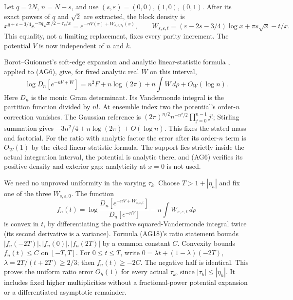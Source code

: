 \documentclass[11pt]{article}
\newcommand{\dd}{\,d}\newcommand{\Gram}{\operatorname{Gram}}
\begin{document}
Let $q=2N$, $n=N+s$, and use $(s,\varepsilon)=(0,0),(1,0),(0,1)$.
After its exact powers of $q$ and $\sqrt2$ are extracted, the block density is
\begin{equation}\tag{AG17}
 x^{q+\varepsilon-3/4}e^{-\pi q\sqrt x/2-\tau_k/x}
 =e^{-nV(x)+W_{s,\varepsilon,\tau_k}(x)},\qquad
 W_{s,\varepsilon,t}=(\varepsilon-2s-3/4)\log x+\pi s\sqrt x-t/x.
\end{equation}
This equality, not a limiting replacement, fixes every parity increment.
The potential $V$ is now independent of $n$ and $k$.

Borot--Guionnet's soft-edge expansion and analytic linear-statistic formula
\cite[Propositions 1.2 and 5.2, equations (1-3)--(1-6)]{BG}, applied to
(AG6), give, for fixed analytic real $W$ on this interval,
\begin{equation}\tag{AG18}
 \log D_n[e^{-nV+W}]
 =n^2F+n\log(2\pi)+n\int W\dd\rho+O_W(\log n).
\end{equation}
Here $D_n$ is the monic Gram determinant. Its Vandermonde integral is the
partition function divided by $n!$. At ensemble index two the potential's
order-$n$ correction vanishes. The Gaussian reference is
$(2\pi)^{n/2}n^{-n^2/2}\prod_{j=0}^{n-1}j!$; Stirling summation gives
$-3n^2/4+n\log(2\pi)+O(\log n)$. This fixes the stated mass and factorial.
For the ratio with analytic factor the error after its order-$n$ term is
$O_W(1)$ by the cited linear-statistic formula. The support lies strictly
inside the actual integration interval, the potential is analytic there,
and (AG6) verifies its positive density and exterior gap; analyticity at
$x=0$ is not used.

We need no unproved uniformity in the varying $\tau_k$. Choose
$T>1+|\eta_h|$ and fix one of the three $W_{s,\varepsilon,0}$.
The function
\[
 f_n(t)=\log\frac{D_n[e^{-nV+W_{s,\varepsilon,t}}]}{D_n[e^{-nV}]}
                  -n\int W_{s,\varepsilon,t}\dd\rho
\]
is convex in $t$, by differentiating the positive squared-Vandermonde
integral twice (its second derivative is a variance).
Formula (AG18)'s ratio statement bounds $|f_n(-2T)|,|f_n(0)|,|f_n(2T)|$
by a common constant $C$. Convexity bounds $f_n(t)\le C$ on $[-T,T]$.
For $0\le t\le T$, write $0=\lambda t+(1-\lambda)(-2T)$,
$\lambda=2T/(t+2T)\ge2/3$; then $f_n(t)\ge-2C$.
The negative half is identical. This proves the uniform ratio error $O_h(1)$
for every actual $\tau_k$, since $|\tau_k|\le|\eta_h|$.
It includes fixed higher multiplicities without a fractional-power potential
expansion or a differentiated asymptotic remainder.
\end{document}
